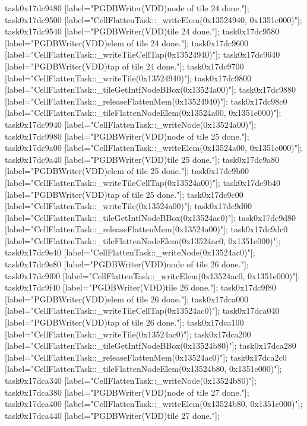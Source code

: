 {	task0x17dc9480 [label="PGDBWriter(VDD)\nCell node of tile 24 done."];
	task0x17dc9500 [label="CellFlattenTask::_writeElem(0x13524940, 0x1351e000)"];
	task0x17dc9540 [label="PGDBWriter(VDD)\nCell tile 24 done."];
	task0x17dc9580 [label="PGDBWriter(VDD)\nCell elem of tile 24 done."];
	task0x17dc9600 [label="CellFlattenTask::_writeTileCellTap(0x13524940)"];
	task0x17dc9640 [label="PGDBWriter(VDD)\nCell tap of tile 24 done."];
	task0x17dc9700 [label="CellFlattenTask::_writeTile(0x13524940)"];
	task0x17dc9800 [label="CellFlattenTask::_tileGetIntfNodeBBox(0x13524a00)"];
	task0x17dc9880 [label="CellFlattenTask::_releaseFlattenMem(0x13524940)"];
	task0x17dc98c0 [label="CellFlattenTask::_tileFlattenNodeElem(0x13524a00, 0x1351e000)"];
	task0x17dc9940 [label="CellFlattenTask::_writeNode(0x13524a00)"];
	task0x17dc9980 [label="PGDBWriter(VDD)\nCell node of tile 25 done."];
	task0x17dc9a00 [label="CellFlattenTask::_writeElem(0x13524a00, 0x1351e000)"];
	task0x17dc9a40 [label="PGDBWriter(VDD)\nCell tile 25 done."];
	task0x17dc9a80 [label="PGDBWriter(VDD)\nCell elem of tile 25 done."];
	task0x17dc9b00 [label="CellFlattenTask::_writeTileCellTap(0x13524a00)"];
	task0x17dc9b40 [label="PGDBWriter(VDD)\nCell tap of tile 25 done."];
	task0x17dc9c00 [label="CellFlattenTask::_writeTile(0x13524a00)"];
	task0x17dc9d00 [label="CellFlattenTask::_tileGetIntfNodeBBox(0x13524ac0)"];
	task0x17dc9d80 [label="CellFlattenTask::_releaseFlattenMem(0x13524a00)"];
	task0x17dc9dc0 [label="CellFlattenTask::_tileFlattenNodeElem(0x13524ac0, 0x1351e000)"];
	task0x17dc9e40 [label="CellFlattenTask::_writeNode(0x13524ac0)"];
	task0x17dc9e80 [label="PGDBWriter(VDD)\nCell node of tile 26 done."];
	task0x17dc9f00 [label="CellFlattenTask::_writeElem(0x13524ac0, 0x1351e000)"];
	task0x17dc9f40 [label="PGDBWriter(VDD)\nCell tile 26 done."];
	task0x17dc9f80 [label="PGDBWriter(VDD)\nCell elem of tile 26 done."];
	task0x17dca000 [label="CellFlattenTask::_writeTileCellTap(0x13524ac0)"];
	task0x17dca040 [label="PGDBWriter(VDD)\nCell tap of tile 26 done."];
	task0x17dca100 [label="CellFlattenTask::_writeTile(0x13524ac0)"];
	task0x17dca200 [label="CellFlattenTask::_tileGetIntfNodeBBox(0x13524b80)"];
	task0x17dca280 [label="CellFlattenTask::_releaseFlattenMem(0x13524ac0)"];
	task0x17dca2c0 [label="CellFlattenTask::_tileFlattenNodeElem(0x13524b80, 0x1351e000)"];
	task0x17dca340 [label="CellFlattenTask::_writeNode(0x13524b80)"];
	task0x17dca380 [label="PGDBWriter(VDD)\nCell node of tile 27 done."];
	task0x17dca400 [label="CellFlattenTask::_writeElem(0x13524b80, 0x1351e000)"];
	task0x17dca440 [label="PGDBWriter(VDD)\nCell tile 27 done."];
}
